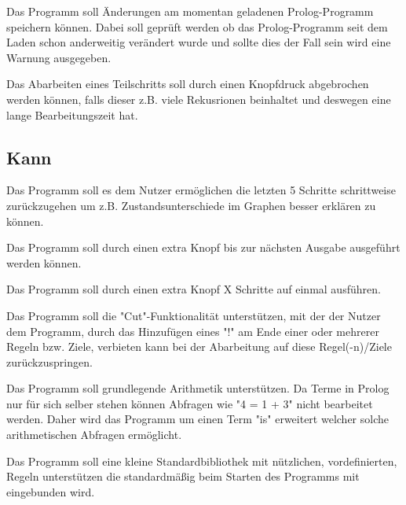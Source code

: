 \documentclass[parskip=full,11pt,twoside]{scrartcl}
\begin{document}

Das Programm soll Änderungen am momentan geladenen Prolog-Programm speichern können. Dabei soll geprüft werden ob das Prolog-Programm seit dem Laden schon anderweitig verändert wurde und sollte dies der Fall sein wird eine Warnung ausgegeben.


Das Abarbeiten eines Teilschritts soll durch einen Knopfdruck abgebrochen werden können, falls dieser z.B. viele Rekusrionen beinhaltet und deswegen eine lange Bearbeitungszeit hat.

\subsection{Kann}


Das Programm soll es dem Nutzer ermöglichen die letzten 5 Schritte schrittweise zurückzugehen um z.B. Zustandsunterschiede im Graphen besser erklären zu können.


Das Programm soll durch einen extra Knopf bis zur nächsten Ausgabe ausgeführt werden können.


Das Programm soll durch einen extra Knopf X Schritte auf einmal ausführen.


Das Programm soll die "Cut"-Funktionalität unterstützen, mit der der Nutzer dem Programm, durch das Hinzufügen eines "!" am Ende einer oder mehrerer Regeln bzw. Ziele, verbieten kann bei der Abarbeitung auf diese Regel(-n)/Ziele zurückzuspringen.


Das Programm soll grundlegende Arithmetik unterstützen. Da Terme in Prolog nur für sich selber stehen können Abfragen wie "4 = 1 + 3" nicht bearbeitet werden. Daher wird das Programm um einen Term "is" erweitert welcher solche arithmetischen Abfragen ermöglicht.


Das Programm soll eine kleine Standardbibliothek mit nützlichen, vordefinierten, Regeln unterstützen die standardmäßig beim Starten des Programms mit eingebunden wird.
\end{document}
